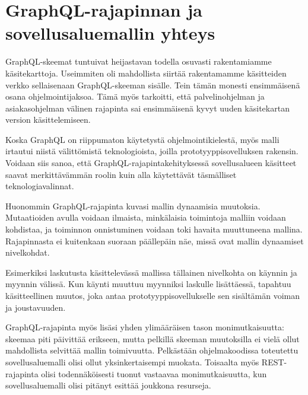 \hypertarget{graphql-rajapinnan-ja-sovellusaluemallin-yhteys}{%
\section{GraphQL-rajapinnan ja sovellusaluemallin
yhteys}\label{graphql-rajapinnan-ja-sovellusaluemallin-yhteys}}

GraphQL-skeemat tuntuivat heijastavan todella osuvasti rakentamiamme
käsitekarttoja. Useimmiten oli mahdollista siirtää rakentamamme
käsitteiden verkko sellaisenaan GraphQL-skeeman sisälle. Tein tämän
monesti ensimmäisenä osana ohjelmointijaksoa. Tämä myös tarkoitti, että
palvelinohjelman ja asiakasohjelman välinen rajapinta sai ensimmäisenä
kyvyt uuden käsitekartan version käsittelemiseen.

Koska GraphQL on riippumaton käytetystä ohjelmointikielestä, myös malli
irtautui niistä välittömistä teknologioista, joilla
prototyyppisovelluksen rakensin. Voidaan siis sanoa, että
GraphQL-rajapintakehityksessä sovellusalueen käsitteet saavat
merkittävämmän roolin kuin alla käytettävät täsmälliset
teknologiavalinnat.

Huonommin GraphQL-rajapinta kuvasi mallin dynaamisia muutoksia.
Mutaatioiden avulla voidaan ilmaista, minkälaisia toimintoja malliin
voidaan kohdistaa, ja toiminnon onnistuminen voidaan toki havaita
muuttuneena mallina. Rajapinnasta ei kuitenkaan suoraan päällepäin näe,
missä ovat mallin dynaamiset nivelkohdat.

Esimerkiksi laskutusta käsittelevässä mallissa tällainen nivelkohta on
käynnin ja myynnin välissä. Kun käynti muuttuu myynniksi laskulle
lisättäessä, tapahtuu käsitteellinen muutos, joka antaa
prototyyppisovellukselle sen sisältämän voiman ja joustavuuden.

GraphQL-rajapinta myös lisäsi yhden ylimääräisen tason monimutkaisuutta:
skeemaa piti päivittää erikseen, mutta pelkillä skeeman muutoksilla ei
vielä ollut mahdollista selvittää mallin toimivuutta. Pelkästään
ohjelmakoodissa toteutettu sovellusaluemalli olisi ollut
yksinkertaisempi muokata. Toisaalta myös REST-rajapinta olisi
todennäköisesti tuonut vastaavaa monimutkaisuutta, kun sovellusaluemalli
olisi pitänyt esittää joukkona resurseja.
